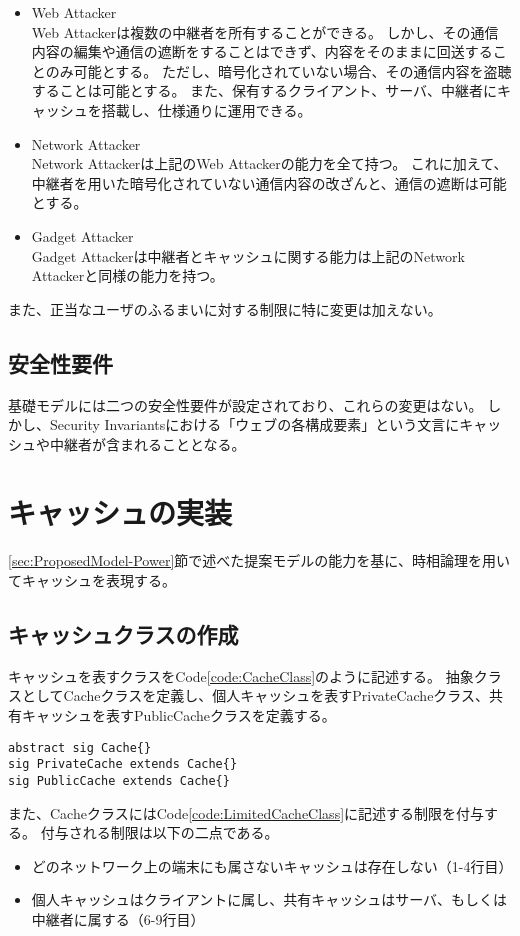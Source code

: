 \documentclass[12pt,a4paper]{jbook}
\begin{document}
\begin{itemize}
\item Web Attacker\\
Web Attackerは複数の中継者を所有することができる。
しかし、その通信内容の編集や通信の遮断をすることはできず、内容をそのままに回送することのみ可能とする。
ただし、暗号化されていない場合、その通信内容を盗聴することは可能とする。
また、保有するクライアント、サーバ、中継者にキャッシュを搭載し、仕様通りに運用できる。
\item Network Attacker\\
Network Attackerは上記のWeb Attackerの能力を全て持つ。
これに加えて、中継者を用いた暗号化されていない通信内容の改ざんと、通信の遮断は可能とする。
\item Gadget Attacker\\
Gadget Attackerは中継者とキャッシュに関する能力は上記のNetwork Attackerと同様の能力を持つ。
\end{itemize}

また、正当なユーザのふるまいに対する制限に特に変更は加えない。

\subsection{安全性要件}
基礎モデルには二つの安全性要件が設定されており、これらの変更はない。
しかし、Security Invariantsにおける「ウェブの各構成要素」という文言にキャッシュや中継者が含まれることとなる。

\section{キャッシュの実装}
\ref{sec:ProposedModel-Power}節で述べた提案モデルの能力を基に、時相論理を用いてキャッシュを表現する。

\subsection{キャッシュクラスの作成}
キャッシュを表すクラスをCode\ref{code:CacheClass}のように記述する。
抽象クラスとしてCacheクラスを定義し、個人キャッシュを表すPrivateCacheクラス、共有キャッシュを表すPublicCacheクラスを定義する。

\begin{lstlisting}[caption=Cacheクラス, label=code:CacheClass]
abstract sig Cache{}
sig PrivateCache extends Cache{}
sig PublicCache extends Cache{}
\end{lstlisting}

また、CacheクラスにはCode\ref{code:LimitedCacheClass}に記述する制限を付与する。
付与される制限は以下の二点である。
\begin{itemize}
\item どのネットワーク上の端末にも属さないキャッシュは存在しない（1-4行目）
\item 個人キャッシュはクライアントに属し、共有キャッシュはサーバ、もしくは中継者に属する（6-9行目）
\end{itemize}
\end{document}
